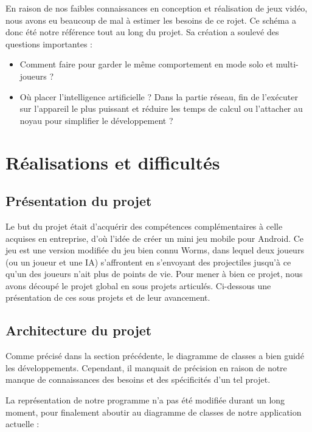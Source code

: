 \documentclass{report}
\begin{document}
En raison de nos faibles connaissances en conception et réalisation de
jeux vidéo, nous avons eu beaucoup de mal à estimer les besoins de ce
rojet. Ce schéma a donc été notre référence tout au long du projet. Sa
création a soulevé des questions importantes :

\begin{itemize}
\item Comment faire pour garder le même comportement en mode solo et
multi-joueurs ?
\item Où placer l’intelligence artificielle ? Dans la partie réseau,
fin de l’exécuter sur l’appareil le plus puissant et réduire les temps
de calcul ou l’attacher au noyau pour simplifier le développement ?
\end{itemize}

\section{Réalisations et difficultés}

\subsection{Présentation du projet}

Le but du projet était d'acquérir des compétences complémentaires à
celle acquises en entreprise, d’où l’idée de créer un mini jeu mobile
pour Android. Ce jeu est une version modifiée du jeu bien connu Worms,
dans lequel deux joueurs (ou un joueur et une IA) s’affrontent en
s’envoyant des projectiles jusqu’à ce qu’un des joueurs n’ait plus de
points de vie.
Pour mener à bien ce projet, nous avons découpé le projet global en
sous projets articulés. Ci-dessous une présentation de ces sous projets
et de leur avancement.

\subsection{Architecture du projet}

Comme précisé dans la section précédente, le diagramme de classes a bien
guidé les développements. Cependant, il manquait de précision en raison
de notre manque de connaissances des besoins et des spécificités d’un
tel projet.

La représentation de notre programme n’a pas été modifiée durant un
long moment, pour finalement aboutir au diagramme de classes de notre
application actuelle :
\end{document}
